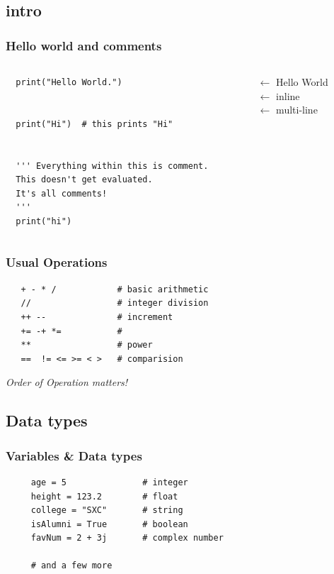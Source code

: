 \documentclass[12pt, aspectratio=169]{beamer}
\begin{document}
\subsection{intro}
\begin{frame}[fragile]
  \frametitle{Hello world and comments}
  \begin{columns}
  \hspace{-2em}\begin{column}{5cm}
  \begin{verbatim}
  print("Hello World.")

  
  print("Hi")  # this prints "Hi" 

  
  ''' Everything within this is comment.
  This doesn't get evaluated.
  It's all comments!
  '''
  print("hi")
  \end{verbatim}
  \end{column}
  \begin{column}{5cm}
   \hspace{5em} $\leftarrow$    Hello World \\ 
    \vspace{2em}
    \hspace{5em}$\leftarrow$    inline  \\
    \vspace{3em}
    \hspace{5em}$\leftarrow$    multi-line \\ 
    \vspace{4em}
  \end{column}
 \end{columns}
 
\end{frame}

\begin{frame} [fragile]
  \frametitle{Usual Operations}
  \begin{verbatim}
   + - * /            # basic arithmetic 
   //                 # integer division
   ++ --              # increment
   += -+ *=           # 
   **                 # power
   ==  != <= >= < >   # comparision
 \end{verbatim}
\vspace{2em}
\emph{Order of Operation matters!}
\end{frame}

\subsection{Data types}
\begin{frame} [fragile]
  \frametitle{Variables \& Data types}
\begin{verbatim}
     age = 5               # integer
     height = 123.2        # float
     college = "SXC"       # string
     isAlumni = True       # boolean
     favNum = 2 + 3j       # complex number

     # and a few more

\end{verbatim}
\end{frame}
\end{document}
